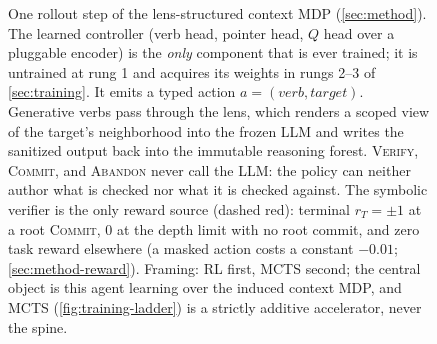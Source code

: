 \begin{figure}[t]
\caption{One rollout step of the lens-structured context MDP
(\cref{sec:method}). The learned controller (verb head, pointer head, $Q$
head over a pluggable encoder) is the \emph{only} component that is ever
trained; it is untrained at rung 1 and acquires its weights in rungs 2--3 of
\cref{sec:training}. It emits a typed action $a = (\textit{verb},
\textit{target})$. Generative verbs pass through the lens, which renders a
scoped view of the target's neighborhood into the frozen LLM and writes the
sanitized output back into the immutable reasoning forest.
\textsc{Verify}, \textsc{Commit}, and \textsc{Abandon} never call the LLM:
the policy can neither author what is checked nor what it is checked
against. The symbolic verifier is the only reward source (dashed red):
terminal $r_T = \pm 1$ at a root \textsc{Commit}, $0$ at the depth limit
with no root commit, and zero task reward elsewhere (a masked action costs
a constant $-0.01$; \cref{sec:method-reward}). Framing: RL first, MCTS
second; the central object is this agent learning over the induced context
MDP, and MCTS (\cref{fig:training-ladder}) is a strictly additive
accelerator, never the spine.}
\label{fig:architecture}
\end{figure}
